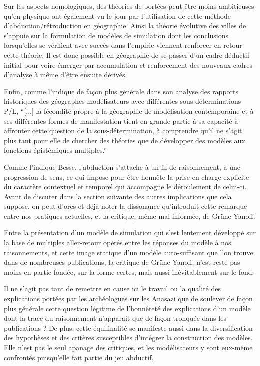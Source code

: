 Sur les aspects nomologiques, des théories de portées peut être moins ambitieuses qu'en physique ont également vu le jour par l'utilisation de cette méthode d'abduction/rétroduction en géographie. Ainsi la théorie évolutive des villes de \textcite{Pumain1997} s'appuie sur la formulation de modèles de simulation dont les conclusions lorsqu'elles se vérifient avec succès dans l'empirie viennent renforcer en retour cette théorie. Il est donc possible en géographie de se passer d'un cadre déductif initial pour voire émerger par accumulation et renforcement des nouveaux cadres d'analyse à même d'être ensuite dérivés. 

Enfin, comme l'indique de façon plus générale \textcite{Varenne2014} dans son analyse des rapports historiques des géographes modélisateurs avec différentes sous-déterminations P/L, \enquote{[...] la fécondité propre à la géographie de modélisation contemporaine et à ses différentes formes de manifestation tient en grande partie à sa capacité à affronter cette question de la sous-détermination, à comprendre qu’il ne s’agit plus tant pour elle de chercher des théories que de développer des modèles aux fonctions épistémiques multiples.}


Comme l'indique Besse, l'abduction s'attache à un fil de raisonnement, à une progression de sens, ce qui impose pour être honnête la prise en charge explicite du caractère contextuel et temporel qui accompagne le déroulement de celui-ci. Avant de discuter dans la section suivante des autres implications que cela suppose, on peut d'ores et déjà noter la dissonance qu'introduit cette remarque entre nos pratiques actuelles, et la critique, même mal informée, de Grüne-Yanoff. 

Entre la présentation d'un modèle de simulation qui s'est lentement développé sur la base de multiples aller-retour opérés entre les réponses du modèle à nos raisonnements, et cette image statique d'un modèle auto-suffisant que l'on trouve dans de nombreuses publications, la critique de Grüne-Yanoff, n'est reste pas moins en partie fondée, sur la forme certes, mais aussi inévitablement sur le fond.

Il ne s'agit pas tant de remettre en cause ici le travail ou la qualité des explications portées par les archéologues sur les Anasazi que de soulever de façon plus générale cette question légitime de l'honnêteté des explications d'un modèle dont la trace du raisonnement n'apparait que de façon tronquée dans les publications ? De plus, cette équifinalité se manifeste aussi dans la diversification des hypothèses et des critères susceptibles d'intégrer la construction des modèles. Elle n'est pas le seul apanage des critiques, et les modélisateurs y sont eux-même confrontés puisqu'elle fait partie du jeu abductif.

